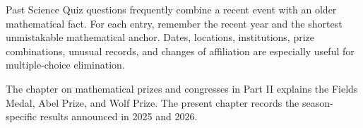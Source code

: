     \begin{strategy}
        Past Science Quiz questions frequently combine a recent event with an
        older mathematical fact. For each entry, remember the recent year and
        the shortest unmistakable mathematical anchor. Dates, locations,
        institutions, prize combinations, unusual records, and changes of
        affiliation are especially useful for multiple-choice elimination.
    \end{strategy}

    The chapter on mathematical prizes and congresses in Part II explains the
    Fields Medal, Abel Prize, and Wolf Prize. The present chapter records the
    season-specific results announced in 2025 and 2026.

    \vspace{1em}


